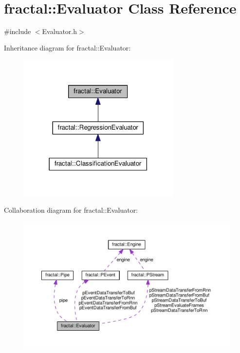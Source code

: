 \hypertarget{classfractal_1_1Evaluator}{\section{fractal\+:\+:Evaluator Class Reference}
\label{classfractal_1_1Evaluator}
}


{\ttfamily \#include $<$Evaluator.\+h$>$}



Inheritance diagram for fractal\+:\+:Evaluator\+:\nopagebreak
\begin{figure}[H]
\begin{center}
\leavevmode
\includegraphics[width=230pt]{dc/d3f/classfractal_1_1Evaluator__inherit__graph}
\end{center}
\end{figure}


Collaboration diagram for fractal\+:\+:Evaluator\+:\nopagebreak
\begin{figure}[H]
\begin{center}
\leavevmode
\includegraphics[width=350pt]{d8/d87/classfractal_1_1Evaluator__coll__graph}
\end{center}
\end{figure}

